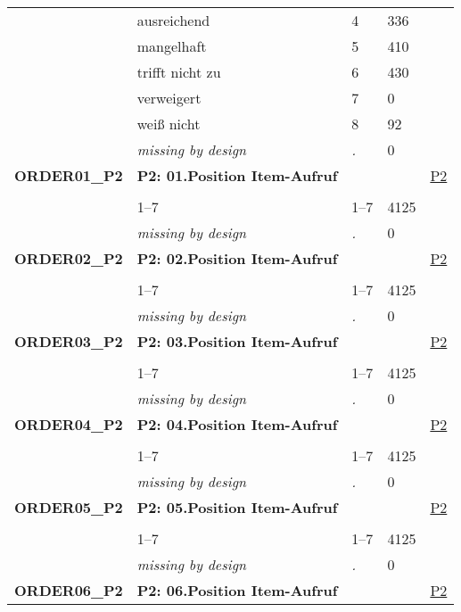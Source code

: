 \begin{longtable}{| L{2.65cm} | L{8cm} | C{1.5cm} | R{1.25cm} | C{2.25cm}  |}
   & ausreichend & 4 & 336 &  \\ 
   & mangelhaft & 5 & 410 &  \\ 
   & trifft nicht zu & 6 & 430 &  \\ 
   & verweigert & 7 & 0 &  \\ 
   & weiß nicht & 8 & 92 &  \\ 
   & \textit{missing by design} & \textit{.} & 0 &  \\ 
   \midrule
\textbf{ORDER01\_P2}\label{var:ORDER01:P2} & \textbf{P2: 01.Position Item-Aufruf} &  &  & \hyperref[P2]{P2} \\ 
   &  &  &  &  \\ 
   & 1--7 & 1--7 & 4125 &  \\ 
   & \textit{missing by design} & \textit{.} & 0 &  \\ 
   \midrule
\textbf{ORDER02\_P2}\label{var:ORDER02:P2} & \textbf{P2: 02.Position Item-Aufruf} &  &  & \hyperref[P2]{P2} \\ 
   &  &  &  &  \\ 
   & 1--7 & 1--7 & 4125 &  \\ 
   & \textit{missing by design} & \textit{.} & 0 &  \\ 
   \midrule
\textbf{ORDER03\_P2}\label{var:ORDER03:P2} & \textbf{P2: 03.Position Item-Aufruf} &  &  & \hyperref[P2]{P2} \\ 
   &  &  &  &  \\ 
   & 1--7 & 1--7 & 4125 &  \\ 
   & \textit{missing by design} & \textit{.} & 0 &  \\ 
   \midrule
\textbf{ORDER04\_P2}\label{var:ORDER04:P2} & \textbf{P2: 04.Position Item-Aufruf} &  &  & \hyperref[P2]{P2} \\ 
   &  &  &  &  \\ 
   & 1--7 & 1--7 & 4125 &  \\ 
   & \textit{missing by design} & \textit{.} & 0 &  \\ 
   \midrule
\textbf{ORDER05\_P2}\label{var:ORDER05:P2} & \textbf{P2: 05.Position Item-Aufruf} &  &  & \hyperref[P2]{P2} \\ 
   &  &  &  &  \\ 
   & 1--7 & 1--7 & 4125 &  \\ 
   & \textit{missing by design} & \textit{.} & 0 &  \\ 
   \midrule
\textbf{ORDER06\_P2}\label{var:ORDER06:P2} & \textbf{P2: 06.Position Item-Aufruf} &  &  & \hyperref[P2]{P2} \\ 

\end{longtable}
